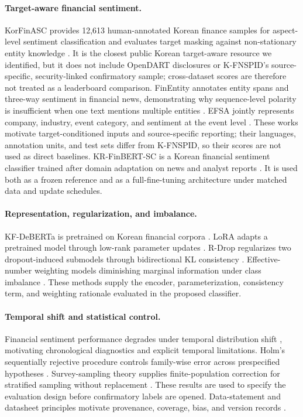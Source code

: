 \documentclass[11pt]{article}
\begin{document}
\paragraph{Target-aware financial sentiment.}
KorFinASC provides 12,613 human-annotated Korean finance samples for aspect-level sentiment classification and evaluates target masking against non-stationary entity knowledge \citep{son-etal-2023-korfinasc}. It is the closest public Korean target-aware resource we identified, but it does not include OpenDART disclosures or K-FNSPID's source-specific, security-linked confirmatory sample; cross-dataset scores are therefore not treated as a leaderboard comparison. FinEntity annotates entity spans and three-way sentiment in financial news, demonstrating why sequence-level polarity is insufficient when one text mentions multiple entities \citep{tang-etal-2023-finentity}. EFSA jointly represents company, industry, event category, and sentiment at the event level \citep{chen-etal-2024-efsa}. These works motivate target-conditioned inputs and source-specific reporting; their languages, annotation units, and test sets differ from K-FNSPID, so their scores are not used as direct baselines. KR-FinBERT-SC is a Korean financial sentiment classifier trained after domain adaptation on news and analyst reports \citep{kim-shin-2022-krfinbert}. It is used both as a frozen reference and as a full-fine-tuning architecture under matched data and update schedules.

\paragraph{Representation, regularization, and imbalance.}
KF-DeBERTa is pretrained on Korean financial corpora \citep{jeon-etal-2023-kfdeberta}. LoRA adapts a pretrained model through low-rank parameter updates \citep{hu-etal-2022-lora}. R-Drop regularizes two dropout-induced submodels through bidirectional KL consistency \citep{liang-etal-2021-rdrop}. Effective-number weighting models diminishing marginal information under class imbalance \citep{cui-etal-2019-classbalanced}. These methods supply the encoder, parameterization, consistency term, and weighting rationale evaluated in the proposed classifier.

\paragraph{Temporal shift and statistical control.}
Financial sentiment performance degrades under temporal distribution shift \citep{guo-etal-2023-predict}, motivating chronological diagnostics and explicit temporal limitations. Holm's sequentially rejective procedure controls family-wise error across prespecified hypotheses \citep{holm-1979}. Survey-sampling theory supplies finite-population correction for stratified sampling without replacement \citep{cochran-1977}. These results are used to specify the evaluation design before confirmatory labels are opened. Data-statement and datasheet principles motivate provenance, coverage, bias, and version records \citep{bender-friedman-2018-data,gebru-etal-2021-datasheets}.
\end{document}
